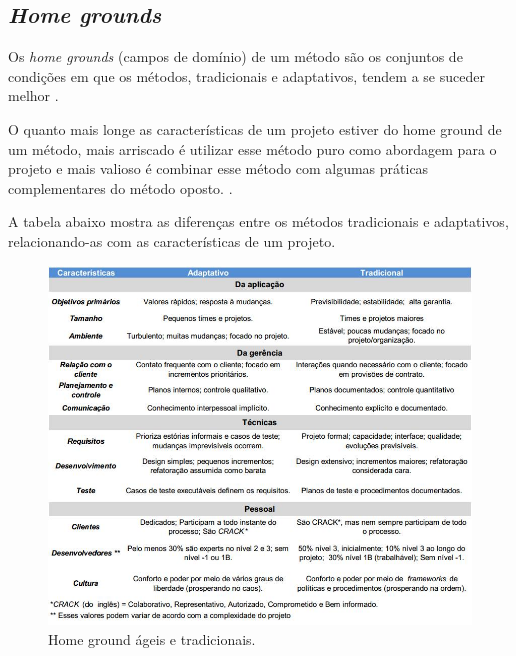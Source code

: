     \pagebreak
    \subsection{\textit{Home grounds}}
      
      Os \textit{home grounds} (campos de domínio) de um método são os conjuntos de condições em que os métodos, tradicionais e
      adaptativos, tendem a se suceder melhor \cite{boehm}.
      
      \begin{citacao}
	O quanto mais longe as características de um projeto estiver do home ground de um método, mais arriscado é utilizar
	esse método puro como abordagem para o projeto e mais valioso é combinar esse método com algumas práticas complementares
	do método oposto. \cite{boehm}.
      \end{citacao}
      
      A tabela abaixo mostra as diferenças entre os métodos tradicionais e adaptativos,
      relacionando-as com as características de um projeto.
      
      \begin{figure}[!htbp]
	\centering
	\includegraphics[scale=0.5]{editaveis/figuras/tabela_homegrounds_conceitos}
	\caption[Home ground ágeis e tradicionais]{Home ground ágeis e tradicionais.\footnotemark}
	\label{tabela_homegrounds_conceitos}
      \end{figure}
   
